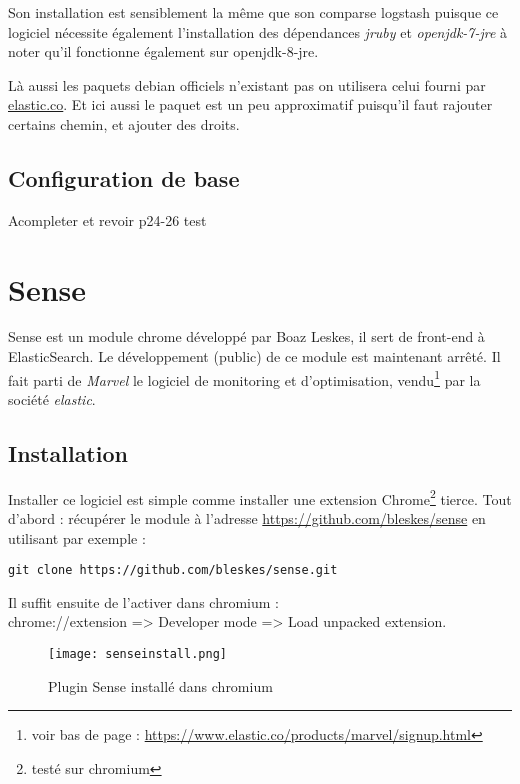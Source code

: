 Son installation est sensiblement la même que son comparse logstash puisque ce logiciel 
nécessite également l'installation des dépendances \emph{jruby} et \emph{openjdk-7-jre}
à noter qu'il fonctionne également sur openjdk-8-jre.

Là aussi les paquets debian officiels n'existant pas on utilisera celui fourni par 
\hyperref[https://download.elastic.co/elasticsearch/elasticsearch/elasticsearch-1.5.1.deb]{elastic.co}.
Et ici aussi le paquet est un peu approximatif puisqu'il faut rajouter certains 
chemin, et ajouter des droits.

\subsection{Configuration de base}


Acompleter et revoir
p24-26
 test


\section{Sense}
Sense est un module chrome développé par Boaz Leskes, il sert de front-end à ElasticSearch.
Le développement (public) de ce module est maintenant arrêté. Il fait parti de 
\emph{Marvel} le logiciel de monitoring et d'optimisation, vendu\footnote{voir bas 
de page : \url{https://www.elastic.co/products/marvel/signup.html}} 
par la société \emph{elastic}.


\subsection{Installation}
Installer ce logiciel est simple comme installer une extension Chrome\footnote{testé sur chromium}
tierce.
Tout d'abord : récupérer le module à l'adresse \url{https://github.com/bleskes/sense}
en utilisant par exemple : 
\begin{lstlisting}[style=code,label=lst:gitclonesense]
git clone https://github.com/bleskes/sense.git
\end{lstlisting}

Il suffit ensuite de l'activer dans chromium :\\ 
chrome://extension => Developer mode => Load unpacked extension.

\begin{figure}[H]
\center
\texttt{[image: senseinstall.png]}
\label{fig:senseinstall}
\caption{Plugin Sense installé dans chromium}
\end{figure}

